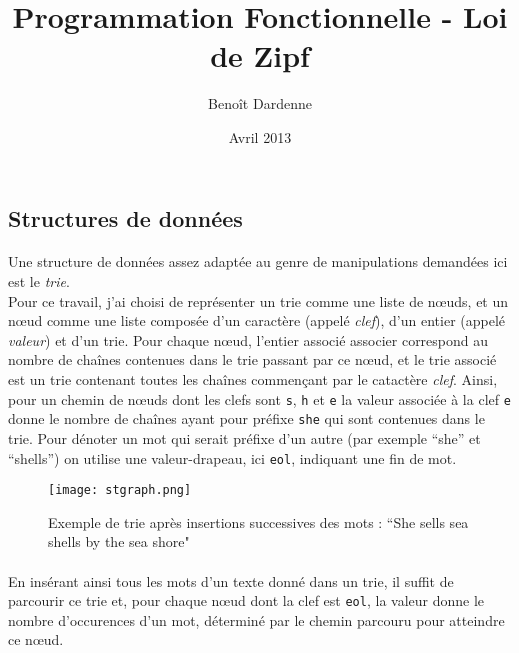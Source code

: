 \documentclass{article}
\title{Programmation Fonctionnelle - Loi de Zipf}
\author{Benoît Dardenne}
\date{Avril 2013}
\begin{document}
\maketitle


\subsection*{Structures de données}

\paragraph{} Une structure de données assez adaptée au genre de manipulations demandées ici est le \emph{trie}.\\
Pour ce travail, j'ai choisi de représenter un trie comme une liste de nœuds, 
et un nœud comme une liste 
composée d'un caractère (appelé \emph{clef}), d'un entier (appelé \emph{valeur}) et d'un trie. 
Pour chaque nœud, l'entier associé associer correspond
au nombre de chaînes contenues dans le trie passant par ce nœud, et le trie associé est un trie 
contenant toutes les chaînes commençant par le catactère \emph{clef}. 
Ainsi, pour un chemin de nœuds dont les clefs sont \verb#s#, \verb#h# et \verb#e# 
la valeur associée à la clef \verb#e# donne le nombre de chaînes ayant pour préfixe \verb#she#
qui sont contenues dans le trie.
Pour dénoter un mot qui serait préfixe d'un autre (par exemple ``she'' et ``shells'') on utilise une
valeur-drapeau, ici \verb#eol#, indiquant une fin de mot.

\begin{figure}[H]
   \centering
   \texttt{[image: stgraph.png]}
   \label{fig:trie}
   \caption{Exemple de trie après insertions successives des mots : ``She sells sea shells by the sea shore"}
\end{figure}

\paragraph{} En insérant ainsi tous les mots d'un texte donné dans un trie, il suffit de parcourir ce trie et,
pour chaque nœud dont la clef est \verb#eol#, la valeur donne le nombre d'occurences d'un mot, déterminé 
par le chemin parcouru pour atteindre ce nœud. 
\end{document}
